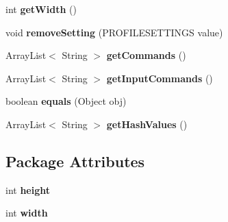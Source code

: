 \begin{DoxyCompactItemize}
\item 
\hypertarget{classvideo_1_1_video_profile_ada2da6089e10d68098a275e001034945}{
int {\bfseries getWidth} ()}
\label{classvideo_1_1_video_profile_ada2da6089e10d68098a275e001034945}

\item 
\hypertarget{classvideo_1_1_video_profile_a24539e1cdfce5b4444708cce47695f5d}{
void {\bfseries removeSetting} (PROFILESETTINGS value)}
\label{classvideo_1_1_video_profile_a24539e1cdfce5b4444708cce47695f5d}

\item 
\hypertarget{classvideo_1_1_video_profile_aaa394240d8b71b32ef180bbefe6e8552}{
ArrayList$<$ String $>$ {\bfseries getCommands} ()}
\label{classvideo_1_1_video_profile_aaa394240d8b71b32ef180bbefe6e8552}

\item 
\hypertarget{classvideo_1_1_video_profile_ae032730f51a6a1121589539511fb2c07}{
ArrayList$<$ String $>$ {\bfseries getInputCommands} ()}
\label{classvideo_1_1_video_profile_ae032730f51a6a1121589539511fb2c07}

\item 
\hypertarget{classvideo_1_1_video_profile_a750f39d45c3ca8af3fb9341bfea3c8c5}{
boolean {\bfseries equals} (Object obj)}
\label{classvideo_1_1_video_profile_a750f39d45c3ca8af3fb9341bfea3c8c5}

\item 
\hypertarget{classvideo_1_1_video_profile_af67afe451da07cfc619564e0dc36bd06}{
ArrayList$<$ String $>$ {\bfseries getHashValues} ()}
\label{classvideo_1_1_video_profile_af67afe451da07cfc619564e0dc36bd06}

\end{DoxyCompactItemize}
\subsection*{Package Attributes}
\begin{DoxyCompactItemize}
\item 
\hypertarget{classvideo_1_1_video_profile_a2632b6ca98196ddef1048150828df1a6}{
int {\bfseries height}}
\label{classvideo_1_1_video_profile_a2632b6ca98196ddef1048150828df1a6}

\item 
\hypertarget{classvideo_1_1_video_profile_af5cdeb2dd7f2febe6f3eb4b58788257a}{
int {\bfseries width}}
\label{classvideo_1_1_video_profile_af5cdeb2dd7f2febe6f3eb4b58788257a}

\end{DoxyCompactItemize}


